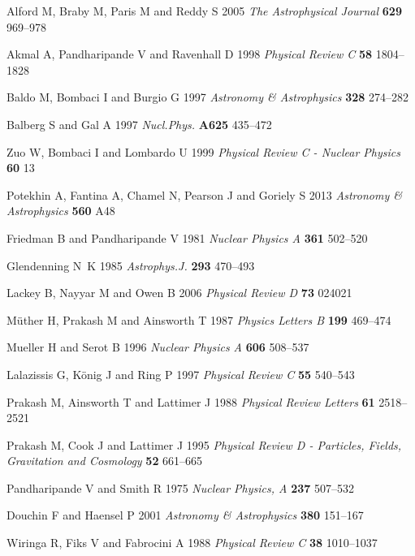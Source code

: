 \documentclass[a4paper]{jpconf} %
\begin{document}
\begin{thebibliography}{10}
Alford M, Braby M, Paris M and Reddy S 2005 {\em The Astrophysical Journal\/}
  {\bf 629} 969--978

Akmal A, Pandharipande V and Ravenhall D 1998 {\em Physical Review C\/} {\bf
  58} 1804--1828

Baldo M, Bombaci I and Burgio G 1997 {\em Astronomy \& Astrophysics\/} {\bf
  328} 274--282

Balberg S and Gal A 1997 {\em Nucl.Phys.\/} {\bf A625} 435--472

Zuo W, Bombaci I and Lombardo U 1999 {\em Physical Review C - Nuclear
  Physics\/} {\bf 60} 13

Potekhin A, Fantina A, Chamel N, Pearson J and Goriely S 2013 {\em Astronomy \&
  Astrophysics\/} {\bf 560} A48

Friedman B and Pandharipande V 1981 {\em Nuclear Physics A\/} {\bf 361}
  502--520

{Glendenning} N~K 1985 {\em Astrophys.J.\/} {\bf 293} 470--493

Lackey B, Nayyar M and Owen B 2006 {\em Physical Review D\/} {\bf 73} 024021

M{\"{u}}ther H, Prakash M and Ainsworth T 1987 {\em Physics Letters B\/} {\bf
  199} 469--474

Mueller H and Serot B 1996 {\em Nuclear Physics A\/} {\bf 606} 508--537

Lalazissis G, K{\"{o}}nig J and Ring P 1997 {\em Physical Review C\/} {\bf 55}
  540--543

Prakash M, Ainsworth T and Lattimer J 1988 {\em Physical Review Letters\/} {\bf
  61} 2518--2521

Prakash M, Cook J and Lattimer J 1995 {\em Physical Review D - Particles,
  Fields, Gravitation and Cosmology\/} {\bf 52} 661--665

Pandharipande V and Smith R 1975 {\em Nuclear Physics, A\/} {\bf 237} 507--532

Douchin F and Haensel P 2001 {\em Astronomy {\&} Astrophysics\/} {\bf 380}
  151--167

Wiringa R, Fiks V and Fabrocini A 1988 {\em Physical Review C\/} {\bf 38}
  1010--1037

\end{thebibliography}
\end{document}
